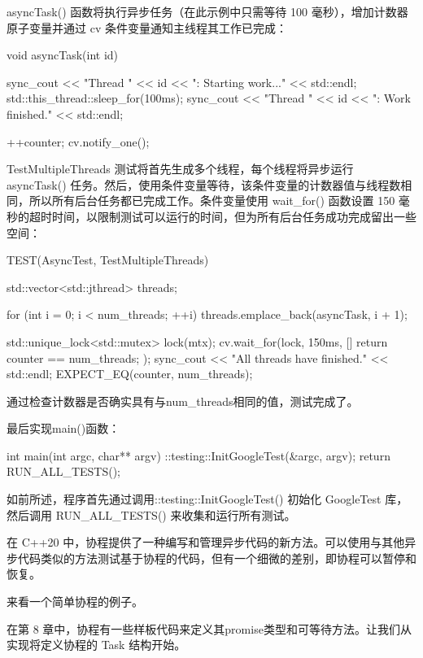 asyncTask() 函数将执行异步任务（在此示例中只需等待 100 毫秒），增加计数器原子变量并通过 cv 条件变量通知主线程其工作已完成：

\begin{cpp}
void asyncTask(int id) {
    sync_cout << "Thread " << id << ": Starting work..."
              << std::endl;
    std::this_thread::sleep_for(100ms);
    sync_cout << "Thread " << id << ": Work finished."
              << std::endl;

    ++counter;
    cv.notify_one();
}
\end{cpp}

TestMultipleThreads 测试将首先生成多个线程，每个线程将异步运行 asyncTask() 任务。然后，使用条件变量等待，该条件变量的计数器值与线程数相同，所以所有后台任务都已完成工作。条件变量使用 wait\_for() 函数设置 150 毫秒的超时时间，以限制测试可以运行的时间，但为所有后台任务成功完成留出一些空间：

\begin{cpp}
TEST(AsyncTest, TestMultipleThreads) {
    std::vector<std::jthread> threads;

    for (int i = 0; i < num_threads; ++i) {
        threads.emplace_back(asyncTask, i + 1);
    }

    {
        std::unique_lock<std::mutex> lock(mtx);
        cv.wait_for(lock, 150ms, [] {
            return counter == num_threads;
        });
        sync_cout << "All threads have finished."
                  << std::endl;
    }
    EXPECT_EQ(counter, num_threads);
}
\end{cpp}

通过检查计数器是否确实具有与num\_threads相同的值，测试完成了。

最后实现main()函数：

\begin{cpp}
int main(int argc, char** argv) {
    ::testing::InitGoogleTest(&argc, argv);
    return RUN_ALL_TESTS();
}
\end{cpp}

如前所述，程序首先通过调用::testing::InitGoogleTest() 初始化 GoogleTest 库，然后调用 RUN\_ALL\_TESTS() 来收集和运行所有测试。


在 C++20 中，协程提供了一种编写和管理异步代码的新方法。可以使用与其他异步代码类似的方法测试基于协程的代码，但有一个细微的差别，即协程可以暂停和恢复。

来看一个简单协程的例子。

在第 8 章中，协程有一些样板代码来定义其promise类型和可等待方法。让我们从实现将定义协程的 Task 结构开始。


